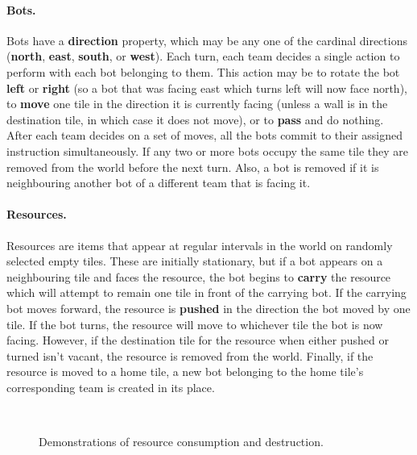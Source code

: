 \documentclass[a4paper,10pt]{article}
\begin{document}
\paragraph{Bots.}
Bots have a \textbf{direction} property, which may be any one of the cardinal directions (\textbf{north}, \textbf{east}, \textbf{south}, or \textbf{west}). Each turn, each team decides a single action to perform with each bot belonging to them. This action may be to rotate the bot \textbf{left} or \textbf{right} (so a bot that was facing east which turns left will now face north), to \textbf{move} one tile in the direction it is currently facing (unless a wall is in the destination tile, in which case it does not move), or to \textbf{pass} and do nothing. After each team decides on a set of moves, all the bots commit to their assigned instruction simultaneously. If any two or more bots occupy the same tile they are removed from the world before the next turn. Also, a bot is removed if it is neighbouring another bot of a different team that is facing it.


\paragraph{Resources.}
Resources are items that appear at regular intervals in the world on randomly selected empty tiles. These are initially stationary, but if a bot appears on a neighbouring tile and faces the resource, the bot begins to \textbf{carry} the resource which will attempt to remain one tile in front of the carrying bot. If the carrying bot moves forward, the resource is \textbf{pushed} in the direction the bot moved by one tile. If the bot turns, the resource will move to whichever tile the bot is now facing. However, if the destination tile for the resource when either pushed or turned isn't vacant, the resource is removed from the world. Finally, if the resource is moved to a home tile, a new bot belonging to the home tile's corresponding team is created in its place.

\begin{figure}[ht]
  \centering
  \mbox{
    \quad
  }
  \caption{Demonstrations of resource consumption and destruction.}
  \vspace{-5mm}
\end{figure}
\end{document}
